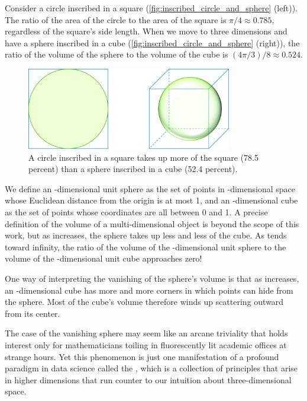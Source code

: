 Consider a circle inscribed in a square (\autoref{fig:inscribed_circle_and_sphere} (left)). The ratio of the area of the circle to the area of the square is $\pi/4 \approx 0.785$, regardless of the square's side length. When we move to three dimensions and have a sphere inscribed in a cube (\autoref{fig:inscribed_circle_and_sphere} (right)), the ratio of the volume of the sphere to the volume of the cube is $(4\pi/3)/8 \approx 0.524$.\\

\begin{figure}[h]
\centering
\mySfFamily
\includegraphics[width = 0.8\textwidth]{../images_CMYK/inscribed_circle_and_sphere}
\caption{A circle inscribed in a square takes up more of the square (78.5 percent) than a sphere inscribed in a cube (52.4 percent).}
\label{fig:inscribed_circle_and_sphere}
\end{figure}

We define an -dimensional unit sphere as the set of points in -dimensional space whose Euclidean distance from the origin is at most 1, and an -dimensional cube as the set of points whose coordinates are all between 0 and 1. A precise definition of the volume of a multi-dimensional object is beyond the scope of this work, but as  increases, the sphere takes up less and less of the cube. As  tends toward infinity, the ratio of the volume of the -dimensional unit sphere to the volume of the -dimensional unit cube approaches zero!

One way of interpreting the vanishing of the sphere's volume is that as  increases, an -dimensional cube has more and more corners in which points can hide from the sphere. Most of the cube's volume therefore winds up scattering outward from its center.

The case of the vanishing sphere may seem like an arcane triviality that holds interest only for mathematicians toiling in fluorescently lit academic offices at strange hours. Yet this phenomenon is just one manifestation of a profound paradigm in data science called the , which is a collection of principles that arise in higher dimensions that run counter to our intuition about three-dimensional space.

